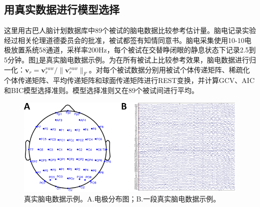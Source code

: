 \subsection{用真实数据进行模型选择}
这里用古巴人脑计划数据库中89个被试的脑电数据比较参考估计量。脑电记录实验经过相关伦理道德委员会的批准，被试都签有知情同意书。脑电采集使用10-10电极放置系统58通道，采样率200Hz，每个被试在交替睁闭眼的静息状态下记录2.5到5分钟。图\ref{3:7}是真实脑电数据示例。为在所有被试上比较参考效果，脑电数据进行归一化：$\mathbf{v}_r=\mathbf{v}_r^{raw}/\lVert\mathbf{v}_r^{raw}\rVert_F$。对每个被试数据分别用被试个体传递矩阵、稀疏化个体传递矩阵、平均传递矩阵和球面传递矩阵进行REST变换，并计算GCV、AIC和BIC模型选择准则。模型选择准则又在89个被试间进行平均。 
\begin{figure}[!h]
	\centering
	\includegraphics[width=15cm]{pic/Frontier/figure7.png}
	\caption{真实脑电数据示例。A.电极分布图；B.一段真实脑电数据示例。}
	\label{3:7}
\end{figure}

